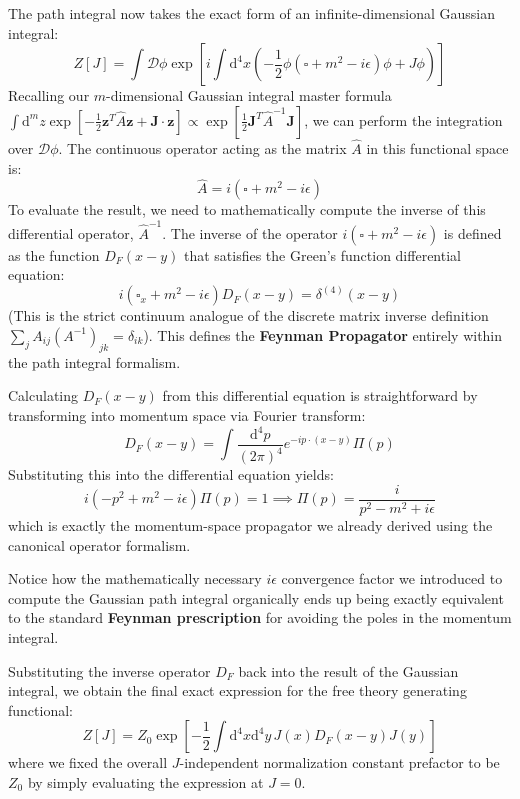 The path integral now takes the exact form of an infinite-dimensional Gaussian integral:
\[
    Z[J] = \int \mathcal{D} \phi \exp\left[ i \int \mathrm{d}^4 x \left( -\frac{1}{2} \phi (\square + m^2 - i \epsilon) \phi + J \phi \right) \right]
\]
Recalling our $m$-dimensional Gaussian integral master formula $\int \mathrm{d}^m z \exp[-\frac{1}{2} \mathbf{z}^T \hat{A} \mathbf{z} + \mathbf{J} \cdot \mathbf{z}] \propto \exp[\frac{1}{2} \mathbf{J}^T \hat{A}^{-1} \mathbf{J}]$, we can perform the integration over $\mathcal{D}\phi$. The continuous operator acting as the matrix $\hat{A}$ in this functional space is:
\[
    \hat{A} = i(\square + m^2 - i \epsilon)
\]
To evaluate the result, we need to mathematically compute the inverse of this differential operator, $\hat{A}^{-1}$. The inverse of the operator $i(\square + m^2 - i \epsilon)$ is defined as the function $D_F(x-y)$ that satisfies the Green's function differential equation:
\[
    i(\square_x + m^2 - i \epsilon) D_F(x-y) = \delta^{(4)}(x-y)
\]
(This is the strict continuum analogue of the discrete matrix inverse definition $\sum_j A_{ij} (A^{-1})_{jk} = \delta_{ik}$). This defines the \textbf{Feynman Propagator} entirely within the path integral formalism.

Calculating $D_F(x-y)$ from this differential equation is straightforward by transforming into momentum space via Fourier transform:
\[
    D_F(x-y) = \int \frac{\mathrm{d}^4 p}{(2\pi)^4} e^{-ip \cdot (x-y)} \Pi(p)
\]
Substituting this into the differential equation yields:
\[
    i(-p^2 + m^2 - i \epsilon) \Pi(p) = 1 \implies \Pi(p) = \frac{i}{p^2 - m^2 + i \epsilon}
\]
which is exactly the momentum-space propagator we already derived using the canonical operator formalism.
\begin{remark}
    Notice how the mathematically necessary $i\epsilon$ convergence factor we introduced to compute the Gaussian path integral organically ends up being exactly equivalent to the standard \textbf{Feynman prescription} for avoiding the poles in the momentum integral.
\end{remark}

Substituting the inverse operator $D_F$ back into the result of the Gaussian integral, we obtain the final exact expression for the free theory generating functional:
\[
    Z[J] = Z_0 \exp\left[ -\frac{1}{2} \int \mathrm{d}^4 x \mathrm{d}^4 y \, J(x) D_F(x-y) J(y) \right]
\]
where we fixed the overall $J$-independent normalization constant prefactor to be $Z_0$ by simply evaluating the expression at $J=0$.

